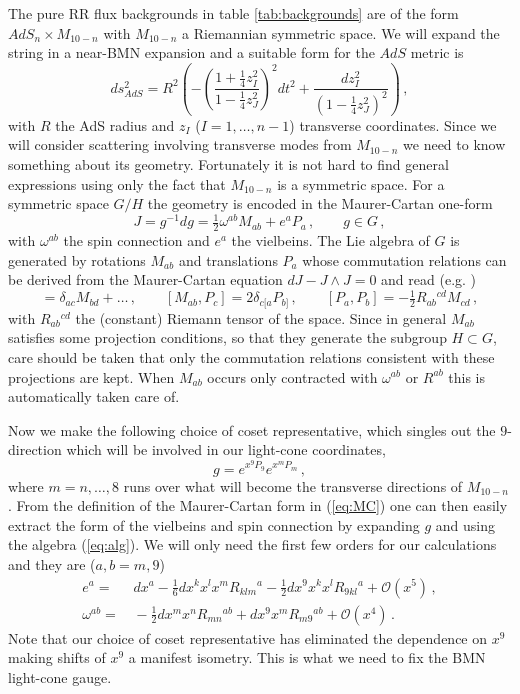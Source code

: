 \documentclass[a4paper,11pt]{article}
\begin{document}
The pure RR flux backgrounds in table \ref{tab:backgrounds} are of the form $AdS_n\times M_{10-n}$ with $M_{10-n}$ a Riemannian symmetric space. We will expand the string in a near-BMN expansion and a suitable form for the $AdS$ metric is
\begin{equation}
ds^2_{AdS}=R^2\left(-\left(\frac{1+\tfrac14z_I^2}{1-\tfrac14z_J^2}\right)^2dt^2+\frac{dz_I^2}{(1-\tfrac14z_J^2)^2}\right)\,,
\end{equation}
with $R$ the AdS radius and $z_I$ ($I=1,\ldots,n-1$) transverse coordinates. Since we will consider scattering involving transverse modes from $M_{10-n}$ we need to know something about its geometry. Fortunately it is not hard to find general expressions using only the fact that $M_{10-n}$ is a symmetric space. For a symmetric space $G/H$ the geometry is encoded in the Maurer-Cartan one-form
\begin{equation}
J=g^{-1}dg=\tfrac12\omega^{ab}M_{ab}+e^aP_a\,,\qquad g\in G\,,
\label{eq:MC}
\end{equation}
with $\omega^{ab}$ the spin connection and $e^a$ the vielbeins. The Lie algebra of $G$ is generated by rotations $M_{ab}$ and translations $P_a$ whose commutation relations can be derived from the Maurer-Cartan equation $dJ-J\wedge J=0$ and read (e.g. \cite{Wulff:2015mwa})
\begin{equation}
[M_{ab},M_{cd}]=\delta_{ac}M_{bd}+\ldots\,,\qquad
[M_{ab},P_c]=2\delta_{c[a}P_{b]}\,,\qquad
[P_a,P_b]=-\tfrac12R_{ab}{}^{cd}M_{cd}\,,
\label{eq:alg}
\end{equation}
with $R_{ab}{}^{cd}$ the (constant) Riemann tensor of the space. Since in general $M_{ab}$ satisfies some projection conditions, so that they generate the subgroup $H\subset G$, care should be taken that only the commutation relations consistent with these projections are kept. When $M_{ab}$ occurs only contracted with $\omega^{ab}$ or $R^{ab}$ this is automatically taken care of.

Now we make the following choice of coset representative, which singles out the $9$-direction which will be involved in our light-cone coordinates,
\begin{equation}
g=e^{x^9P_9}e^{x^mP_m}\,,
\end{equation}
where $m=n,\ldots,8$ runs over what will become the transverse directions of $M_{10-n}$. From the definition of the Maurer-Cartan form in (\ref{eq:MC}) one can then easily extract the form of the vielbeins and spin connection by expanding $g$ and using the algebra (\ref{eq:alg}). We will only need the first few orders for our calculations and they are ($a,b=m,9$)
\begin{align}
e^a=&\,
dx^a
-\tfrac16dx^kx^lx^mR_{klm}{}^a
-\tfrac12dx^9x^kx^lR_{9kl}{}^a
+\mathcal O(x^5)
\,,
\\
\omega^{ab}
=&\,
-\tfrac12dx^mx^nR_{mn}{}^{ab}
+dx^9x^mR_{m9}{}^{ab}
+\mathcal O(x^4)\,.
\end{align}
Note that our choice of coset representative has eliminated the dependence on $x^9$ making shifts of $x^9$ a manifest isometry. This is what we need to fix the BMN light-cone gauge.
\end{document}
